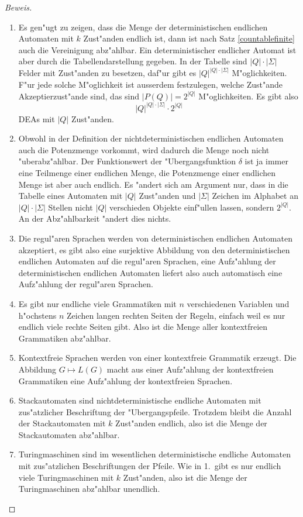 \begin{proof}[Beweis]
\begin{enumerate}
\item Es gen"ugt zu zeigen, dass die Menge der deterministischen
endlichen Automaten mit $k$ Zust"anden endlich ist, dann ist nach
Satz \ref{countablefinite} auch die Vereinigung abz"ahlbar. Ein
deterministischer endlicher Automat ist aber durch die Tabellendarstellung
gegeben. In der Tabelle sind $|Q|\cdot|\Sigma|$ Felder mit Zust"anden
zu besetzen, daf"ur gibt es $|Q|^{|Q|\cdot|\Sigma|}$ M"oglichkeiten.
F"ur jede solche M"oglichkeit ist ausserdem festzulegen, welche Zust"ande
Akzeptierzust"ande sind, das sind $|P(Q)|=2^{|Q|}$ M"oglichkeiten. Es gibt
also
\[
|Q|^{|Q|\cdot|\Sigma|}\cdot 2^{|Q|}
\]
DEAs mit $|Q|$ Zust"anden.
\item Obwohl in der Definition der nichtdeterministischen endlichen
Automaten auch die Potenzmenge vorkommt, wird dadurch die Menge
noch nicht "uber\-abz"ahlbar. Der Funktionswert der "Ubergangsfunktion
$\delta$ ist ja immer eine Teilmenge einer endlichen Menge, die Potenzmenge
einer endlichen Menge ist aber auch endlich. Es "andert sich am Argument
nur, dass in die Tabelle eines Automaten mit $|Q|$ Zust"anden und
$|\Sigma|$ Zeichen im Alphabet an $|Q|\cdot|\Sigma|$ Stellen
nicht $|Q|$ verschieden Objekte einf"ullen lassen, sondern $2^{|Q|}$.
An der Abz"ahlbarkeit "andert dies nichts.
\item Die regul"aren Sprachen werden von deterministischen endlichen
Automaten akzeptiert, es gibt also eine surjektive Abbildung von
den deterministischen endlichen Automaten auf die regul"aren Sprachen,
eine Aufz"ahlung der deterministischen endlichen Automaten liefert also
auch automatisch eine Aufz"ahlung der regul"aren Sprachen.
\item Es gibt nur endliche viele Grammatiken mit $n$ verschiedenen
Variablen und h"ochstens $n$ Zeichen langen rechten Seiten der Regeln,
einfach weil es nur endlich viele rechte Seiten gibt. Also ist die
Menge aller kontextfreien Grammatiken abz"ahlbar.
\item Kontextfreie Sprachen werden von einer kontextfreie Grammatik
erzeugt. Die Abbildung $G\mapsto L(G)$ macht aus einer Aufz"ahlung
der kontextfreien Grammatiken eine Aufz"ahlung der kontextfreien Sprachen.
\item Stackautomaten sind nichtdeterministische endliche Automaten mit
zus"atzlicher Beschriftung der "Ubergangspfeile. Trotzdem bleibt die
Anzahl der Stackautomaten mit $k$ Zust"anden endlich, also ist die
Menge der Stackautomaten abz"ahlbar.
\item Turingmaschinen sind im wesentlichen deterministische endliche Automaten
mit zus"atzlichen Beschriftungen der Pfeile. Wie in 1.~gibt es nur endlich
viele Turingmaschinen mit $k$ Zust"anden, also ist die Menge der Turingmaschinen
abz"ahlbar unendlich.
\end{enumerate}
\end{proof}

